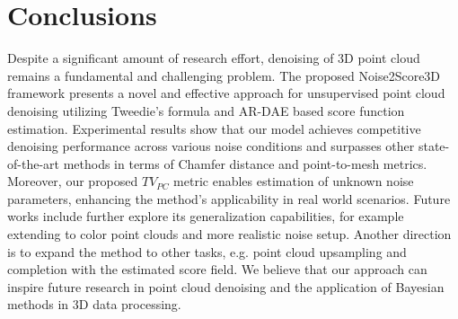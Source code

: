 \section{Conclusions}
Despite a significant amount of research effort, denoising of 3D point cloud remains a fundamental and challenging problem. The proposed Noise2Score3D framework presents a novel and effective approach for unsupervised point cloud denoising utilizing Tweedie’s formula and AR-DAE based score function estimation. Experimental results show that our model achieves competitive denoising performance across various noise conditions and surpasses other state-of-the-art methods in terms of Chamfer distance and point-to-mesh metrics. Moreover, our proposed $TV_{PC}$ metric enables estimation of unknown noise parameters, enhancing the method's applicability in real world scenarios. Future works include further explore its generalization capabilities, for example extending to  color point clouds and more realistic noise setup. Another direction is to expand the method to other tasks, e.g. point cloud upsampling and completion with the estimated score field. We believe that our approach can inspire future research in point cloud denoising and the application of Bayesian methods in 3D data processing.


